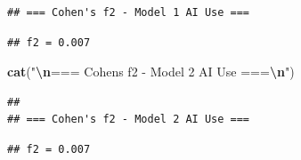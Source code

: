 \documentclass[
]{article}
\newenvironment{Shaded}{\begin{snugshade}}{\end{snugshade}}
\newcommand{\DecValTok}[1]{\textcolor[rgb]{0.00,0.00,0.81}{#1}}
\newcommand{\FunctionTok}[1]{\textcolor[rgb]{0.13,0.29,0.53}{\textbf{#1}}}
\newcommand{\NormalTok}[1]{#1}
\newcommand{\SpecialCharTok}[1]{\textcolor[rgb]{0.81,0.36,0.00}{\textbf{#1}}}
\newcommand{\StringTok}[1]{\textcolor[rgb]{0.31,0.60,0.02}{#1}}
\begin{document}
\begin{verbatim}
## === Cohen's f2 - Model 1 AI Use ===
\end{verbatim}

\begin{Shaded}
\end{Shaded}

\begin{verbatim}
## f2 = 0.007
\end{verbatim}

\begin{Shaded}
\begin{Highlighting}[]
\FunctionTok{cat}\NormalTok{(}\StringTok{"}\SpecialCharTok{\textbackslash{}n}\StringTok{=== Cohen\textquotesingle{}s f2 {-} Model 2 AI Use ===}\SpecialCharTok{\textbackslash{}n}\StringTok{"}\NormalTok{)}
\end{Highlighting}
\end{Shaded}

\begin{verbatim}
## 
## === Cohen's f2 - Model 2 AI Use ===
\end{verbatim}

\begin{Shaded}
\end{Shaded}

\begin{verbatim}
## f2 = 0.007
\end{verbatim}
\end{document}
